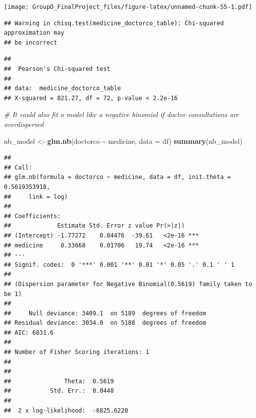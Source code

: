 \documentclass[
]{article}
\newenvironment{Shaded}{\begin{snugshade}}{\end{snugshade}}
\newcommand{\AttributeTok}[1]{\textcolor[rgb]{0.13,0.29,0.53}{#1}}
\newcommand{\CommentTok}[1]{\textcolor[rgb]{0.56,0.35,0.01}{\textit{#1}}}
\newcommand{\FunctionTok}[1]{\textcolor[rgb]{0.13,0.29,0.53}{\textbf{#1}}}
\newcommand{\NormalTok}[1]{#1}
\newcommand{\OtherTok}[1]{\textcolor[rgb]{0.56,0.35,0.01}{#1}}
\newcommand{\SpecialCharTok}[1]{\textcolor[rgb]{0.81,0.36,0.00}{\textbf{#1}}}
\begin{document}
\texttt{[image: GroupO\_FinalProject\_files/figure-latex/unnamed-chunk-55-1.pdf]}

\begin{Shaded}
\end{Shaded}

\begin{verbatim}
## Warning in chisq.test(medicine_doctorco_table): Chi-squared approximation may
## be incorrect
\end{verbatim}

\begin{verbatim}
## 
##  Pearson's Chi-squared test
## 
## data:  medicine_doctorco_table
## X-squared = 821.27, df = 72, p-value < 2.2e-16
\end{verbatim}

\begin{Shaded}
\begin{Highlighting}[]
\CommentTok{\# It could also fit a model like a negative binomial if doctor consultations are overdispersed}

\NormalTok{nb\_model }\OtherTok{\textless{}{-}} \FunctionTok{glm.nb}\NormalTok{(doctorco }\SpecialCharTok{\textasciitilde{}}\NormalTok{ medicine, }\AttributeTok{data =}\NormalTok{ df)}
\FunctionTok{summary}\NormalTok{(nb\_model)}
\end{Highlighting}
\end{Shaded}

\begin{verbatim}
## 
## Call:
## glm.nb(formula = doctorco ~ medicine, data = df, init.theta = 0.5619353918, 
##     link = log)
## 
## Coefficients:
##             Estimate Std. Error z value Pr(>|z|)    
## (Intercept) -1.77272    0.04476  -39.61   <2e-16 ***
## medicine     0.33668    0.01706   19.74   <2e-16 ***
## ---
## Signif. codes:  0 '***' 0.001 '**' 0.01 '*' 0.05 '.' 0.1 ' ' 1
## 
## (Dispersion parameter for Negative Binomial(0.5619) family taken to be 1)
## 
##     Null deviance: 3409.1  on 5189  degrees of freedom
## Residual deviance: 3034.0  on 5188  degrees of freedom
## AIC: 6831.6
## 
## Number of Fisher Scoring iterations: 1
## 
## 
##               Theta:  0.5619 
##           Std. Err.:  0.0448 
## 
##  2 x log-likelihood:  -6825.6220
\end{verbatim}
\end{document}
